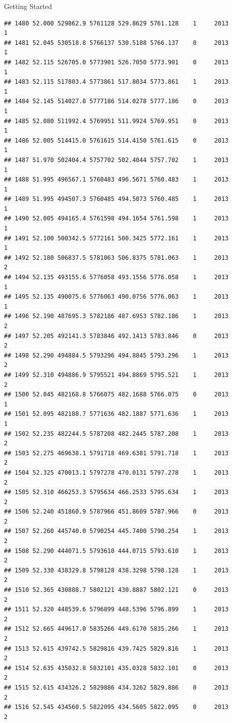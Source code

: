 \documentclass[
  ignorenonframetext,
]{beamer}
\begin{document}
\begin{frame}[fragile]{Getting Started}
\begin{verbatim}
## 1480 52.000 529862.9 5761128 529.8629 5761.128    1     2013        1
## 1481 52.045 530518.8 5766137 530.5188 5766.137    0     2013        1
## 1482 52.115 526705.0 5773901 526.7050 5773.901    0     2013        1
## 1483 52.115 517803.4 5773861 517.8034 5773.861    1     2013        1
## 1484 52.145 514027.8 5777186 514.0278 5777.186    0     2013        1
## 1485 52.080 511992.4 5769951 511.9924 5769.951    0     2013        1
## 1486 52.005 514415.0 5761615 514.4150 5761.615    0     2013        1
## 1487 51.970 502404.4 5757702 502.4044 5757.702    1     2013        1
## 1488 51.995 496567.1 5760483 496.5671 5760.483    1     2013        1
## 1489 51.995 494507.3 5760485 494.5073 5760.485    1     2013        1
## 1490 52.005 494165.4 5761598 494.1654 5761.598    1     2013        1
## 1491 52.100 500342.5 5772161 500.3425 5772.161    1     2013        1
## 1492 52.180 506837.5 5781063 506.8375 5781.063    1     2013        2
## 1494 52.135 493155.6 5776058 493.1556 5776.058    1     2013        1
## 1495 52.135 490075.6 5776063 490.0756 5776.063    1     2013        1
## 1496 52.190 487695.3 5782186 487.6953 5782.186    1     2013        2
## 1497 52.205 492141.3 5783846 492.1413 5783.846    0     2013        2
## 1498 52.290 494884.5 5793296 494.8845 5793.296    1     2013        2
## 1499 52.310 494886.9 5795521 494.8869 5795.521    1     2013        2
## 1500 52.045 482168.8 5766075 482.1688 5766.075    0     2013        1
## 1501 52.095 482188.7 5771636 482.1887 5771.636    1     2013        1
## 1502 52.235 482244.5 5787208 482.2445 5787.208    1     2013        2
## 1503 52.275 469638.1 5791718 469.6381 5791.718    1     2013        2
## 1504 52.325 470013.1 5797278 470.0131 5797.278    1     2013        2
## 1505 52.310 466253.3 5795634 466.2533 5795.634    1     2013        2
## 1506 52.240 451860.9 5787966 451.8609 5787.966    0     2013        2
## 1507 52.260 445740.0 5790254 445.7400 5790.254    1     2013        2
## 1508 52.290 444071.5 5793610 444.0715 5793.610    1     2013        2
## 1509 52.330 438329.8 5798128 438.3298 5798.128    1     2013        2
## 1510 52.365 430888.7 5802121 430.8887 5802.121    0     2013        2
## 1511 52.320 448539.6 5796899 448.5396 5796.899    1     2013        2
## 1512 52.665 449617.0 5835266 449.6170 5835.266    1     2013        2
## 1513 52.615 439742.5 5829816 439.7425 5829.816    1     2013        2
## 1514 52.635 435032.8 5832101 435.0328 5832.101    0     2013        2
## 1515 52.615 434326.2 5829886 434.3262 5829.886    0     2013        2
## 1516 52.545 434560.5 5822095 434.5605 5822.095    0     2013        2

\end{verbatim}
\end{frame}
\end{document}
